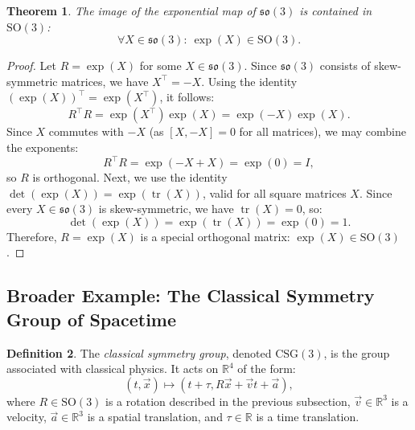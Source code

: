 \documentclass{amsart}
\newtheorem{theorem}{Theorem}[section]
\theoremstyle{definition}
\newtheorem{definition}[theorem]{Definition}
\theoremstyle{remark}
\DeclareMathOperator{\tr}{tr}
\begin{document}
\begin{theorem}\label{thm:so3_exp_map_in_SO3}
  The image of the exponential map of $\mathfrak{so}(3)$ is contained in $\mathrm{SO}(3)$:
  \begin{equation*}
    \forall X \in \mathfrak{so}(3):\ \exp(X) \in \mathrm{SO}(3).
  \end{equation*}
\end{theorem}
\begin{proof}
  Let $R = \exp(X)$ for some $X \in \mathfrak{so}(3)$.
  Since $\mathfrak{so}(3)$ consists of skew-symmetric matrices, we have $X^\top = -X$.
  Using the identity $\left(\exp(X)\right)^\top = \exp(X^\top)$, it follows:
  \begin{equation*}
    R^\top R = \exp(X^\top)\exp(X) = \exp(-X)\exp(X).
  \end{equation*}
  Since $X$ commutes with $-X$ (as $[X, -X] = 0$ for all matrices), we may combine the exponents:
  \begin{equation*}
    R^\top R = \exp(-X + X) = \exp(0) = I,
  \end{equation*}
  so $R$ is orthogonal.
  Next, we use the identity $\det(\exp(X)) = \exp(\tr(X))$, valid for all square matrices $X$.
  Since every $X \in \mathfrak{so}(3)$ is skew-symmetric, we have $\tr(X) = 0$, so:
  \begin{equation*}
    \det(\exp(X)) = \exp(\tr(X)) = \exp(0) = 1.
  \end{equation*}
  Therefore, $R = \exp(X)$ is a special orthogonal matrix: $\exp(X) \in \mathrm{SO}(3)$.
\end{proof}

\subsection{Broader Example: The Classical Symmetry Group of Spacetime}
\label{subsec:csg}
\begin{definition}
  The \emph{classical symmetry group}, denoted $\mathrm{CSG}(3)$, is the group associated with classical physics.
  It acts on $\mathbb{R}^4$ of the form:
  \begin{equation*}
    (t, \vec{x}) \mapsto (t + \tau, R \vec{x} + \vec{v} t + \vec{a}),
  \end{equation*}
  where $R \in \mathrm{SO}(3)$ is a rotation described in the previous subsection, $\vec{v} \in \mathbb{R}^3$ is a velocity, $\vec{a} \in \mathbb{R}^3$ is a spatial translation, and $\tau \in \mathbb{R}$ is a time translation.
\end{definition}
\end{document}

